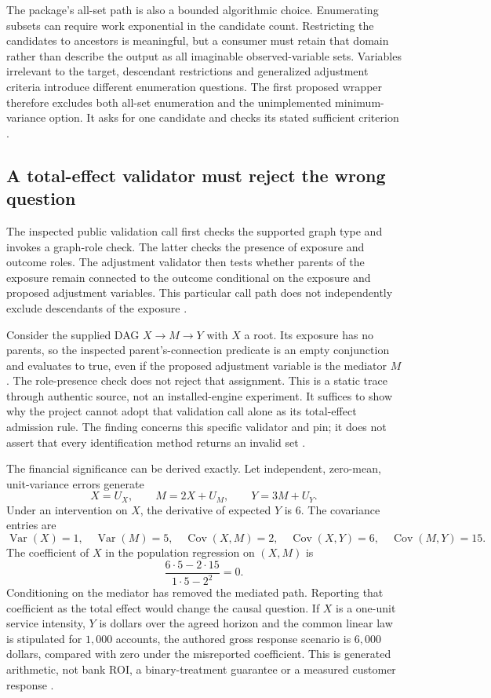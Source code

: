 The package's all-set path is also a bounded algorithmic choice. Enumerating
subsets can require work exponential in the candidate count. Restricting
the candidates to ancestors is meaningful, but a consumer must retain that
domain rather than describe the output as all imaginable observed-variable
sets. Variables irrelevant to the target, descendant restrictions and
generalized adjustment criteria introduce different enumeration questions.
The first proposed wrapper therefore excludes both all-set enumeration and
the unimplemented minimum-variance option. It asks for one candidate and
checks its stated sufficient criterion
\citep{exec13_pgmpy_reuse_primary}.

\subsection{A total-effect validator must reject the wrong question}

The inspected public validation call first checks the supported graph type
and invokes a graph-role check. The latter checks the presence of exposure
and outcome roles. The adjustment validator then tests whether parents of
the exposure remain connected to the outcome conditional on the exposure
and proposed adjustment variables. This particular call path does not
independently exclude descendants of the exposure
\citep{exec13_pgmpy_reuse_primary}.

Consider the supplied DAG $X\to M\to Y$ with $X$ a root. Its exposure
has no parents, so the inspected parent's-connection predicate is an empty
conjunction and evaluates to true, even if the proposed adjustment variable
is the mediator $M$. The role-presence check does not reject that assignment.
This is a static trace through authentic source, not an installed-engine
experiment. It suffices to show why the project cannot adopt that validation
call alone as its total-effect admission rule. The finding concerns this
specific validator and pin; it does not assert that every identification
method returns an invalid set
\citep{exec13_pgmpy_reuse_primary,exec13_pgmpy_reuse_oracle}.

The financial significance can be derived exactly. Let independent,
zero-mean, unit-variance errors generate
\[
 X=U_X,\qquad M=2X+U_M,\qquad Y=3M+U_Y.
\]
Under an intervention on $X$, the derivative of expected $Y$ is $6$.
The covariance entries are
\[
 \operatorname{Var}(X)=1,\quad \operatorname{Var}(M)=5,\quad
 \operatorname{Cov}(X,M)=2,\quad
 \operatorname{Cov}(X,Y)=6,\quad \operatorname{Cov}(M,Y)=15.
\]
The coefficient of $X$ in the population regression on $(X,M)$ is
\[
 \frac{6\cdot5-2\cdot15}{1\cdot5-2^2}=0.
\]
Conditioning on the mediator has removed the mediated path. Reporting that
coefficient as the total effect would change the causal question. If $X$
is a one-unit service intensity, $Y$ is dollars over the agreed horizon and
the common linear law is stipulated for $1{,}000$ accounts, the authored
gross response scenario is $6{,}000$ dollars, compared with zero under the
misreported coefficient. This is generated arithmetic, not bank ROI, a
binary-treatment guarantee or a measured customer response
\citep{exec13_pgmpy_reuse_oracle}.

